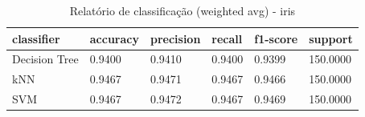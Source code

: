 \begin{table}[htbp]
\centering
\begin{tabular}{llllll}
\hline
classifier & accuracy & precision & recall & f1-score & support \\
\hline
Decision Tree & 0.9400 & 0.9410 & 0.9400 & 0.9399 & 150.0000 \\
kNN & 0.9467 & 0.9471 & 0.9467 & 0.9466 & 150.0000 \\
SVM & 0.9467 & 0.9472 & 0.9467 & 0.9469 & 150.0000 \\
\hline
\end{tabular}
\caption{Relatório de classificação (weighted avg) - iris}
\label{tab:ex3-iris-classification-report}
\end{table}